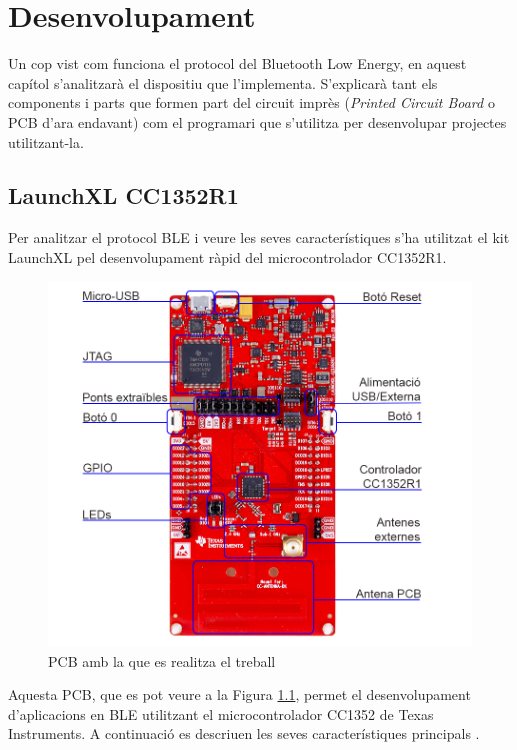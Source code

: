 \chapter{Desenvolupament}
Un cop vist com funciona el protocol del Bluetooth Low Energy, en aquest capítol s'analitzarà el dispositiu que l'implementa.
S'explicarà tant els components i parts que formen part del circuit imprès (\textit{Printed Circuit Board} o PCB d'ara endavant) com el programari que s'utilitza per desenvolupar projectes utilitzant-la.

\section{LaunchXL CC1352R1}
Per analitzar el protocol BLE i veure les seves característiques s'ha utilitzat el kit LaunchXL pel desenvolupament ràpid del microcontrolador CC1352R1.

\begin{figure}[h!]
	\begin{center}
		\includegraphics[width=\textwidth]{./images/launchxl-cc1352r1.png}
		\caption{PCB amb la que es realitza el treball \cite{placa}}
		\label{PCB}
	\end{center}
\end{figure}

Aquesta PCB, que es pot veure a la Figura \ref{PCB}, permet el desenvolupament d'aplicacions en BLE utilitzant el microcontrolador CC1352 de Texas Instruments.
A continuació es descriuen les seves característiques principals \cite{placa_datasheet}.


